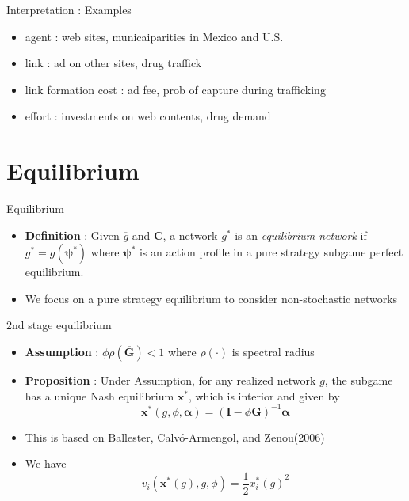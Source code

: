 \documentclass[10pt,dvipdfmx]{beamer}
\begin{document}
\begin{frame}{Interpretation : Examples}
\begin{itemize}
    \item agent : web sites, municaiparities in Mexico and U.S.
    \item link : ad on other sites, drug traffick
    \item link formation cost : ad fee, prob of capture during trafficking
    \item effort : investments on web contents, drug demand
\end{itemize}
\end{frame}


\section{Equilibrium}

\begin{frame}{Equilibrium}
\begin{itemize}
    \item {\bf{Definition}} : Given $\overline{g}$ and $\bm{C}$, a network $g^*$ is an {\it{equilibrium network}} if $g^* = g(\bm{\psi}^*)$ where $\bm{\psi}^*$ is an action profile in a pure strategy subgame perfect equilibrium.
    \item We focus on a pure strategy equilibrium to consider non-stochastic networks
\end{itemize}
\end{frame}

\begin{frame}{2nd stage equilibrium}
\begin{itemize}
    \item {\bf{Assumption}} : $\phi \rho(\bm{\overline{G}}) < 1$ where $\rho(\cdot)$ is spectral radius
    \item {\bf{Proposition}} : Under Assumption, for any realized network $g$, the subgame has a unique Nash equilibrium $\bm{x}^*$, which is interior and given by
    \[ \bm{x}^*(g, \phi, \bm{\alpha}) = {(\bm{I} - \phi \bm{G})}^{-1} \bm{\alpha} \]
    \item This is based on Ballester, Calv\'{o}-Armengol, and Zenou(2006)
    \item We have
    \[ v_i(\bm{x}^*(g), g, \phi) = \frac{1}{2} {x_i^*(g)}^2 \]
\end{itemize}
\end{frame}
\end{document}
